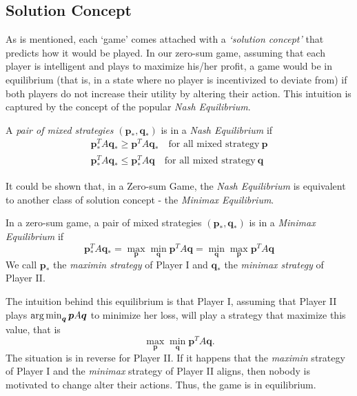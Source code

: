 \documentclass[journal, 11pt, a4paper, twoside]{IEEEtran}
\begin{document}
\subsection{Solution Concept}
As is mentioned, each `game' comes attached with a \textit{`solution concept'} that predicts how it would be played. In our zero-sum game, assuming that each player is intelligent and plays to maximize his/her profit, a game would be in equilibrium (that is, in a state where no player is incentivized to deviate from) if both players do not increase their utility by altering their action. This intuition is captured by the concept of the popular \textit{Nash Equilibrium}.
\begin{definition}
        A \textit{pair of mixed strategies} $(\bm{p}_*, \bm{q}_*)$ is in a \textit{Nash Equilibrium} if \begin{align*}
            \bm{p}_*^TA\bm{q_*} \geq \bm{p}^TA \bm{q}_* \quad \text{for all mixed strategy} \ \bm{p} \\
            \bm{p}_*^TA\bm{q_*} \leq \bm{p}_*^TA \bm{q} \quad \text{for all mixed strategy} \ \bm{q}
        \end{align*}
    \end{definition}
It could be shown that, in a Zero-sum Game, the \textit{Nash Equilibrium} is equivalent to another class of solution concept - the \textit{Minimax Equilibrium}.
\begin{definition}
        In a zero-sum game, a pair of mixed strategies $(\bm{p}_*, \bm{q}_*)$ is in a \textit{Minimax Equilibrium} if 
        \[
        \bm{p}^T_*A\bm{q}_* = \max_{\bm{p}}\min_{\bm{q}} \bm{p}^TA\bm{q} = \min_{\bm{q}}\max_{\bm{p}} \bm{p}^TA\bm{q}
        \]
        We call $\bm{p}_*$ the \textit{maximin strategy} of Player I and $\bm{q}_*$ the \textit{minimax strategy} of Player II.
    \end{definition}
\noindent The intuition behind this equilibrium is that Player I, assuming that Player II plays $\operatorname*{arg\,min}_{\bm{q}} \bm{p}A\bm{q}$ to minimize her loss, will play a strategy that maximize this value, that is
\[
\max_{\bm{p}}\min_{\bm{q}}\bm{p}^TA\bm{q}.
\]
The situation is in reverse for Player II. If it happens that the \textit{maximin} strategy of Player I and the \textit{minimax} strategy of Player II aligns, then nobody is motivated to change alter their actions. Thus, the game is in equilibrium.
\end{document}
